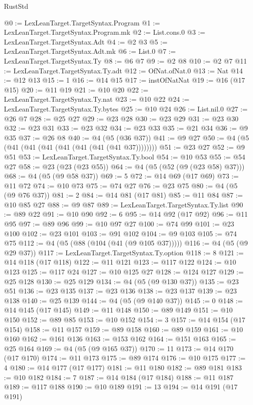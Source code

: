 \begin{lexlean}{RustStd}
\begin{coremodule}
@0 := LexLeanTarget.TargetSyntax.Program
@1 := LexLeanTarget.TargetSyntax.Program.mk
@2 := List.cons.{0}
@3 := LexLeanTarget.TargetSyntax.Adt
@4 := @2 @3
@5 := LexLeanTarget.TargetSyntax.Adt.mk
@6 := List.{0}
@7 := LexLeanTarget.TargetSyntax.Ty
@8 := @6 @7
@9 := @2 @8
@10 := @2 @7
@11 := LexLeanTarget.TargetSyntax.Ty.adt
@12 := OfNat.ofNat.{0}
@13 := Nat
@14 := @12 @13
@15 := 1
@16 := @14 @15
@17 := instOfNatNat
@19 := @16 (@17 @15)
@20 := @11 @19
@21 := @10 @20
@22 := LexLeanTarget.TargetSyntax.Ty.nat
@23 := @10 @22
@24 := LexLeanTarget.TargetSyntax.Ty.bytes
@25 := @10 @24
@26 := List.nil.{0}
@27 := @26 @7
@28 := @25 @27
@29 := @23 @28
@30 := @23 @29
@31 := @23 @30
@32 := @23 @31
@33 := @23 @32
@34 := @23 @33
@35 := @21 @34
@36 := @9 @35
@37 := @26 @8
@40 := @4 (@5 (@36 @37))
@41 := @9 @27
@50 := @4 (@5 (@41 (@41 (@41 (@41 (@41 (@41 (@41 @37))))))))
@51 := @23 @27
@52 := @9 @51
@53 := LexLeanTarget.TargetSyntax.Ty.bool
@54 := @10 @53
@55 := @54 @27
@58 := @23 (@23 (@23 @55))
@64 := @4 (@5 (@52 (@9 (@23 @58) @37)))
@68 := @4 (@5 (@9 @58 @37))
@69 := 5
@72 := @14 @69 (@17 @69)
@73 := @11 @72
@74 := @10 @73
@75 := @74 @27
@76 := @23 @75
@80 := @4 (@5 (@9 @76 @37))
@81 := 2
@84 := @14 @81 (@17 @81)
@85 := @11 @84
@87 := @10 @85 @27
@88 := @9 @87
@89 := LexLeanTarget.TargetSyntax.Ty.list
@90 := @89 @22
@91 := @10 @90
@92 := 6
@95 := @14 @92 (@17 @92)
@96 := @11 @95
@97 := @89 @96
@99 := @10 @97 @27
@100 := @74 @99
@101 := @23 @100
@102 := @23 @101
@103 := @91 @102
@104 := @9 @103
@105 := @74 @75
@112 := @4 (@5 (@88 (@104 (@41 (@9 @105 @37)))))
@116 := @4 (@5 (@9 @29 @37))
@117 := LexLeanTarget.TargetSyntax.Ty.option
@118 := 8
@121 := @14 @118 (@17 @118)
@122 := @11 @121
@123 := @117 @122
@124 := @10 @123
@125 := @117 @24
@127 := @10 @125 @27
@128 := @124 @127
@129 := @25 @128
@130 := @25 @129
@134 := @4 (@5 (@9 @130 @37))
@135 := @23 @51
@136 := @23 @135
@137 := @23 @136
@138 := @23 @137
@139 := @23 @138
@140 := @25 @139
@144 := @4 (@5 (@9 @140 @37))
@145 := 0
@148 := @14 @145 (@17 @145)
@149 := @11 @148
@150 := @89 @149
@151 := @10 @150
@152 := @89 @85
@153 := @10 @152
@154 := 3
@157 := @14 @154 (@17 @154)
@158 := @11 @157
@159 := @89 @158
@160 := @89 @159
@161 := @10 @160
@162 := @161 @136
@163 := @153 @162
@164 := @151 @163
@165 := @25 @164
@169 := @4 (@5 (@9 @165 @37))
@170 := 11
@173 := @14 @170 (@17 @170)
@174 := @11 @173
@175 := @89 @174
@176 := @10 @175
@177 := 4
@180 := @14 @177 (@17 @177)
@181 := @11 @180
@182 := @89 @181
@183 := @10 @182
@184 := 7
@187 := @14 @184 (@17 @184)
@188 := @11 @187
@189 := @117 @188
@190 := @10 @189
@191 := 13
@194 := @14 @191 (@17 @191)

\end{coremodule}
\end{lexlean}
